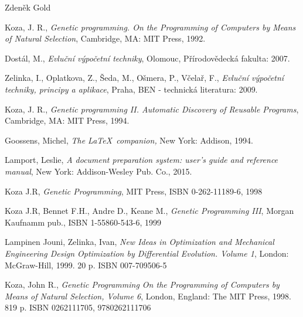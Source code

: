 \documentclass[bc,male,java,dept460]{diploma}		%
\begin{document}
\bigskip
\begin{flushright}
Zdeněk Gold
\end{flushright}

\begin{thebibliography}{99}

 Koza, J. R.,
\textit{Genetic programming. On the Programming of Computers by Means of Natural Selection},
Cambridge, MA: MIT Press, 1992.

 Dostál, M.,
\textit{Evluční výpočetní techniky},
Olomouc, Přírodovědecká fakulta: 2007.

 Zelinka, I., Oplatkova, Z., Šeda, M., Ošmera, P., Včelař, F.,
\textit{Evluční výpočetní techniky, principy a aplikace},
Praha, BEN - technická literatura: 2009.

 Koza, J. R.,
\textit{Genetic programming II. Automatic Discovery of Reusable Programs},
Cambridge, MA: MIT Press, 1994.

 Goossens, Michel,
\textit{The \LaTeX\ companion,} New York: Addison, 1994.

 Lamport, Leslie,
\textit{A document preparation system: user's guide and reference manual},
New York: Addison-Wesley Pub. Co., 2015.

 Koza J.R, 
\textit{Genetic Programming},
MIT Press, ISBN 0-262-11189-6, 1998

 Koza J.R, Bennet F.H., Andre D., Keane M.,
\textit{Genetic Programming III},
Morgan Kaufnamm pub., ISBN 1-55860-543-6, 1999

 Lampinen Jouni, Zelinka, Ivan,
\textit{New Ideas in Optimization and Mechanical Engineering Design Optimization by Differential Evolution. Volume 1},
London: McGraw-Hill, 1999. 20 p. ISBN 007-709506-5

 Koza, John R.,
\textit{Genetic Programming On the Programming of Computers by Means of Natural Selection, Volume 6},
London, England: The MIT Press, 1998. 819 p. ISBN 0262111705, 9780262111706

 

\end{thebibliography}
\end{document}
